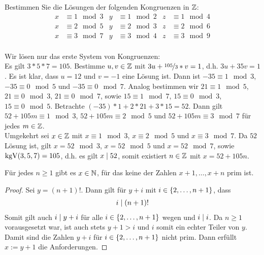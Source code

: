 \begin{exercisePage}
    \begin{exercise}[Präsenz]
        Bestimmen Sie die Lösungen der folgenden Kongruenzen in $\mathbb{Z}$:
        \begin{align*}
            x &\equiv 1 \mod 3 & y &\equiv 1 \mod 2 & z &\equiv 1 \mod 4 \\
            x &\equiv 2 \mod 5 & y &\equiv 2 \mod 3 & z &\equiv 2 \mod 6 \\
            x &\equiv 3 \mod 7 & y &\equiv 3 \mod 4 & z &\equiv 3 \mod 9 \\
        \end{align*}
    \end{exercise}
    \begin{solution}
        Wir lösen nur das erste System von Kongruenzen: \\
        Es gilt $3*5*7 = 105$. Bestimme $u,v \in \mathbb{Z}$ mit $3u + \lfrac{105}{3} * v = 1$, d.h. $3u+35v = 1$. Es ist klar, dass $u=12$ und $v=-1$ eine Lösung ist. Dann ist $-35 \equiv 1 \mod 3$, $-35 \equiv 0 \mod 5$ und $-35 \equiv 0 \mod 7$. Analog bestimmen wir $21 \equiv 1 \mod 5$, $21 \equiv 0 \mod 3$, $21 \equiv 0 \mod 7$, sowie $15 \equiv 1 \mod 7$, $15 \equiv 0 \mod 3$, $15 \equiv 0 \mod 5$. Betrachte $(-35)*1 + 2*21 + 3*15 = 52$. Dann gilt $52 + 105m \equiv 1 \mod 3$, $52 + 105m \equiv 2 \mod 5$ und $52 + 105m \equiv 3 \mod 7$ für jedes $m \in \mathbb{Z}$. \\
        Umgekehrt sei $x \in \mathbb{Z}$ mit $x \equiv 1 \mod 3$, $x \equiv 2 \mod 5$ und $x \equiv 3 \mod 7$. Da $52$ Lösung ist, gilt $x =52 \mod 3$, $x = 52 \mod 5$ und $x = 52 \mod 7$, sowie $\operatorname{kgV}(3,5,7) = 105$, d.h. es gilt $x \mathrel{\mid} 52$, somit existiert $n \in \mathbb{Z}$ mit $x = 52 + 105n$.
    \end{solution}

    \begin{exercise}[Präsenz]
        Für jedes $n \geq 1$ gibt es $x \in \mathbb{N}$, für das keine der Zahlen $x+1 , \dots , x+n$ prim ist.
    \end{exercise}
    \begin{proof}
        Sei $y = (n+1)!$. Dann gilt für $y+i$ mit $i \in \left\{ 2, \dots, n+1 \right\}$, dass 
        \begin{align}
            i \mathrel{\mid} (n+1)! \label{eq: 130_teilbarkeit}
        \end{align}
        Somit gilt auch $i \mathrel{\mid} y+i$ für alle $i \in \left\{ 2, \dots , n+1 \right\}$ wegen  und $i \mathrel{\mid} i$. Da $n \geq 1$ vorausgesetzt war, ist auch stets $y+1 > i$ und $i$ somit ein echter Teiler von $y$. Damit sind die Zahlen $y+i$ für $i \in \left\{ 2, \dots , n+1 \right\}$ nicht prim. Dann erfüllt $x := y+1$ die Anforderungen.
    \end{proof}
\undef\zsqrt
\end{exercisePage}